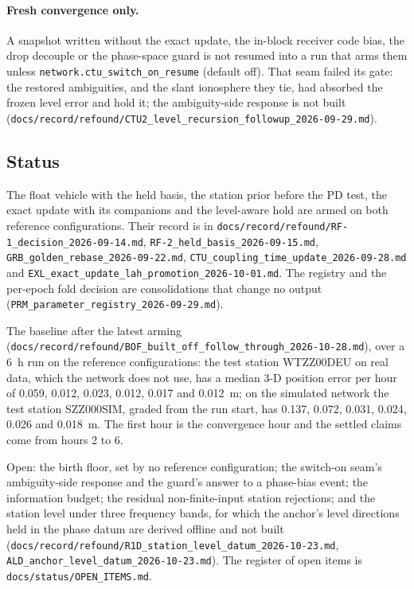\documentclass[main.tex]{subfiles}
\begin{document}
\paragraph{Fresh convergence only.}
A snapshot written without the exact update, the in-block receiver code
bias, the drop decouple or the phase-space guard is not resumed into a run
that arms them unless \texttt{network.ctu\_switch\_on\_resume} (default
off). That seam failed its gate: the restored ambiguities, and the
slant ionosphere they tie, had absorbed the frozen level error and hold it;
the ambiguity-side response is not built
(\texttt{docs/record/refound/CTU2\_level\_recursion\_followup\_2026-09-29.md}).

\subsection{Status}
\label{sec:net-vehicle-standing}

The float vehicle with the held basis, the station prior before the PD
test, the exact update with its companions and the level-aware hold are
armed on both reference configurations. Their record is in
\texttt{docs/record/refound/RF-1\_decision\_2026-09-14.md},
\texttt{RF-2\_held\_basis\_2026-09-15.md},
\texttt{GRB\_golden\_rebase\_2026-09-22.md},
\texttt{CTU\_coupling\_time\_update\_2026-09-28.md} and
\texttt{EXL\_exact\_update\_lah\_promotion\_2026-10-01.md}. The registry and
the per-epoch fold decision are consolidations that change no output
(\texttt{PRM\_parameter\_registry\_2026-09-29.md}).

The baseline after the latest arming
(\texttt{docs/record/refound/BOF\_built\_off\_follow\_through\_2026-10-28.md}), over
a 6~h run on the reference configurations: the test station WTZZ00DEU on
real data, which the network does not use, has a median 3-D position error
per hour of 0.059, 0.012, 0.023, 0.012, 0.017 and 0.012~m; on the
simulated network the test station SZZ000SIM, graded from the run start, has
0.137, 0.072, 0.031, 0.024, 0.026 and 0.018~m. The first hour is the
convergence hour and the settled claims come from hours 2 to 6.

Open: the birth floor, set by no reference configuration; the switch-on
seam's ambiguity-side response and the guard's answer to a phase-bias event;
the information budget; the residual non-finite-input station rejections;
and the station level under three frequency bands, for which the anchor's
level directions held in the phase datum are derived offline and not built
(\texttt{docs/record/refound/R1D\_station\_level\_datum\_2026-10-23.md},
\texttt{ALD\_anchor\_level\_datum\_2026-10-23.md}). The register of open
items is \texttt{docs/status/OPEN\_ITEMS.md}.

\ifSubfilesClassLoaded{\printbibliography}{}
\end{document}
